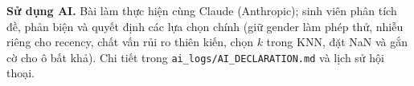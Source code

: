 \documentclass[12pt,a4paper]{article}
\newcommand{\code}[1]{\texttt{#1}}
\begin{document}
\textbf{Sử dụng AI.} Bài làm thực hiện cùng Claude (Anthropic); sinh viên phân tích đề, phản biện và quyết định các lựa chọn chính (giữ gender làm phép thử, nhiễu riêng cho recency, chất vấn rủi ro thiên kiến, chọn $k$ trong KNN, đặt NaN và gắn cờ cho ô bất khả). Chi tiết trong \code{ai\_logs/AI\_DECLARATION.md} và lịch sử hội thoại.
\end{document}
